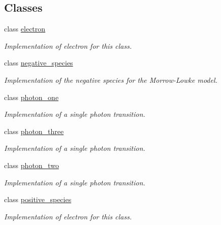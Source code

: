 \subsection*{Classes}
\begin{DoxyCompactItemize}
\item 
class \hyperlink{classair__bolsig_1_1electron}{electron}
\begin{DoxyCompactList}\small\item\em Implementation of electron for this class. \end{DoxyCompactList}\item 
class \hyperlink{classair__bolsig_1_1negative__species}{negative\+\_\+species}
\begin{DoxyCompactList}\small\item\em Implementation of the negative species for the Morrow-\/\+Lowke model. \end{DoxyCompactList}\item 
class \hyperlink{classair__bolsig_1_1photon__one}{photon\+\_\+one}
\begin{DoxyCompactList}\small\item\em Implementation of a single photon transition. \end{DoxyCompactList}\item 
class \hyperlink{classair__bolsig_1_1photon__three}{photon\+\_\+three}
\begin{DoxyCompactList}\small\item\em Implementation of a single photon transition. \end{DoxyCompactList}\item 
class \hyperlink{classair__bolsig_1_1photon__two}{photon\+\_\+two}
\begin{DoxyCompactList}\small\item\em Implementation of a single photon transition. \end{DoxyCompactList}\item 
class \hyperlink{classair__bolsig_1_1positive__species}{positive\+\_\+species}
\begin{DoxyCompactList}\small\item\em Implementation of electron for this class. \end{DoxyCompactList}\end{DoxyCompactItemize}
